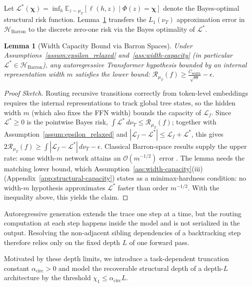 \documentclass{article}
\newtheorem{lemma}{Lemma}
\begin{document}
Let $\mathcal{L}^*(\boldsymbol{\chi})
=
\inf_{h}
\mathbb{E}_{z \sim \mu_T}
[\ell(h,z)\mid \Phi(z)=\boldsymbol{\chi}]$
denote the Bayes-optimal structural risk function. 
Lemma~\ref{lemma:width_capacity} transfers the $L_1(\nu_T)$ approximation error in $\mathcal{H}_{\mathrm{Barron}}$ to the discrete zero-one risk via the Bayes optimality of $\mathcal{L}^*$.

\begin{lemma}[Width Capacity Bound via Barron Spaces]
\label{lemma:width_capacity}
Under Assumptions~\ref{assum:epsilon_relaxed} and~\ref{ass:width-capacity} (in particular $\mathcal{L}^* \in \mathcal{H}_{\mathrm{Barron}}$), any autoregressive Transformer hypothesis bounded by an internal representation width $m$ satisfies the lower bound: $\mathcal{R}_{\mu_T}(f) \ge \frac{C_{\mathrm{width}}}{\sqrt{m}} - \epsilon$.
\end{lemma}

\begin{proof}[Proof Sketch] 
Routing recursive transitions correctly from token-level embeddings requires the internal representations to track global tree states, so the hidden width $m$ (which also fixes the FFN width) bounds the capacity of $\mathcal{L}_f$. Since $\mathcal{L}^*\ge 0$ is the pointwise Bayes risk, $\int\mathcal{L}^*\,d\nu_T\le\mathcal{R}_{\mu_T}(f)$; together with Assumption~\ref{assum:epsilon_relaxed} and $|\mathcal{L}_f-\mathcal{L}^*|\le\mathcal{L}_f+\mathcal{L}^*$, this gives $2\mathcal{R}_{\mu_T}(f)\ge\int|\mathcal{L}_f-\mathcal{L}^*|\,d\nu_T-\epsilon$. Classical Barron-space results supply the upper rate: some width-$m$ network attains an $\mathcal{O}(m^{-1/2})$ error \citep{Barron1993, MAKOVOZ199698}. The lemma needs the matching lower bound, which Assumption~\ref{ass:width-capacity}(iii) (Appendix~\ref{app:structural-capacity}) states as a minimax-hardness condition: no width-$m$ hypothesis approximates $\mathcal{L}^*$ faster than order $m^{-1/2}$. With the inequality above, this yields the claim. %
\end{proof}

Autoregressive generation extends the trace one step at a time, but the routing computation at each step happens inside the model and is not serialized in the output. Resolving the non-adjacent sibling dependencies of a backtracking step therefore relies only on the fixed depth $L$ of one forward pass.

Motivated by these depth limits, we introduce a task-dependent truncation constant $\alpha_{\mathrm{circ}}>0$ and model the recoverable structural depth of a depth-$L$ architecture by the threshold $\chi_1 \le \alpha_{\mathrm{circ}}L$.
\end{document}
